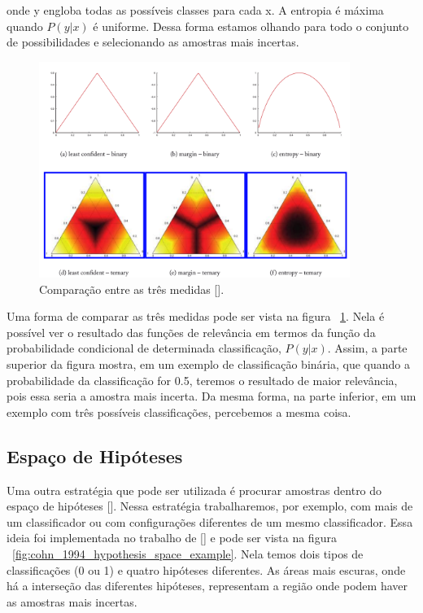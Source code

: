 onde y engloba todas as possíveis classes para cada x. A entropia é máxima quando $P(y\lvert x)$ é uniforme. Dessa forma estamos olhando para todo o conjunto de possibilidades e selecionando as amostras mais incertas.


\begin{figure}
  \centering
  \includegraphics[width=0.9\textwidth]{figures/settles_2014_uncertainty_medidas.png}
  \caption{Comparação entre as três medidas [\cite{settles2014active}].}
  \label{fig:settles_2014_uncertainty_medidas}
\end{figure}



Uma forma de comparar as três medidas pode ser vista na figura ~\ref{fig:settles_2014_uncertainty_medidas}. Nela é possível ver o resultado das funções de relevância em termos da função da probabilidade condicional de determinada classificação, $P(y\lvert x)$. Assim, a parte superior da figura mostra, em um exemplo de classificação binária, que quando a probabilidade da classificação for 0.5, teremos o resultado de maior relevância, pois essa seria a amostra mais incerta. Da mesma forma, na parte inferior, em um exemplo com três possíveis classificações, percebemos a mesma coisa. 


\subsection{Espaço de Hipóteses} 
\label{sec:hypothesis_space}

Uma outra estratégia que pode ser utilizada é procurar amostras dentro do espaço de hipóteses [\cite{mitchell1978version, mitchell1982generalization}]. Nessa estratégia trabalharemos, por exemplo, com mais de um classificador ou com configurações diferentes de um mesmo classificador. Essa ideia foi implementada no trabalho de [\cite{atlas1990training,cohn1994improving}] e pode ser vista na figura ~\ref{fig:cohn_1994_hypothesis_space_example}. Nela temos dois tipos de classificações (0 ou 1) e quatro hipóteses diferentes. As áreas mais escuras, onde há a interseção das diferentes hipóteses, representam a região onde podem haver as amostras mais incertas. 

